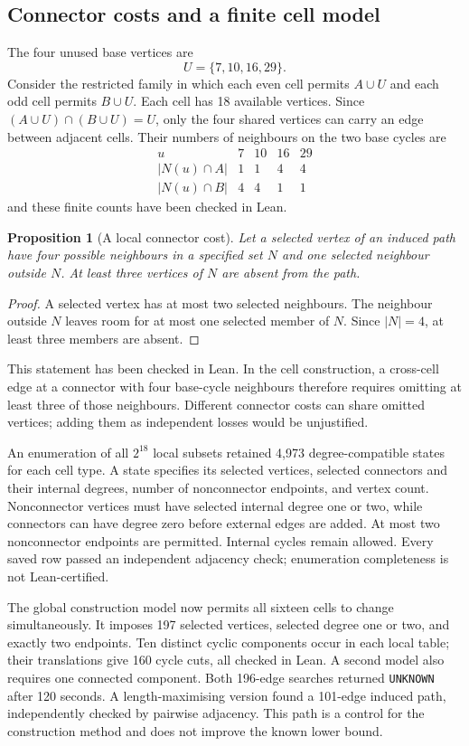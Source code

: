 \documentclass[11pt,a4paper]{article}
\newtheorem{proposition}[theorem]{Proposition}
\theoremstyle{definition}
\theoremstyle{remark}
\begin{document}
\subsection{Connector costs and a finite cell model}
The four unused base vertices are
\[
U=\{7,10,16,29\}.
\]
Consider the restricted family in which each even cell permits $A\cup U$ and each odd cell permits $B\cup U$. Each cell has 18 available vertices. Since $(A\cup U)\cap(B\cup U)=U$, only the four shared vertices can carry an edge between adjacent cells. Their numbers of neighbours on the two base cycles are
\[
\begin{array}{c|rrrr}
u&7&10&16&29\\\hline
|N(u)\cap A|&1&1&4&4\\
|N(u)\cap B|&4&4&1&1
\end{array}
\]
and these finite counts have been checked in Lean.

\begin{proposition}[A local connector cost]
Let a selected vertex of an induced path have four possible neighbours in a specified set $N$ and one selected neighbour outside $N$. At least three vertices of $N$ are absent from the path.
\end{proposition}
\begin{proof}
A selected vertex has at most two selected neighbours. The neighbour outside $N$ leaves room for at most one selected member of $N$. Since $|N|=4$, at least three members are absent.
\end{proof}
This statement has been checked in Lean. In the cell construction, a cross-cell edge at a connector with four base-cycle neighbours therefore requires omitting at least three of those neighbours. Different connector costs can share omitted vertices; adding them as independent losses would be unjustified.

An enumeration of all $2^{18}$ local subsets retained 4,973 degree-compatible states for each cell type. A state specifies its selected vertices, selected connectors and their internal degrees, number of nonconnector endpoints, and vertex count. Nonconnector vertices must have selected internal degree one or two, while connectors can have degree zero before external edges are added. At most two nonconnector endpoints are permitted. Internal cycles remain allowed. Every saved row passed an independent adjacency check; enumeration completeness is not Lean-certified.

The global construction model now permits all sixteen cells to change simultaneously. It imposes 197 selected vertices, selected degree one or two, and exactly two endpoints. Ten distinct cyclic components occur in each local table; their translations give 160 cycle cuts, all checked in Lean. A second model also requires one connected component. Both 196-edge searches returned \texttt{UNKNOWN} after 120 seconds. A length-maximising version found a 101-edge induced path, independently checked by pairwise adjacency. This path is a control for the construction method and does not improve the known lower bound.
\end{document}
